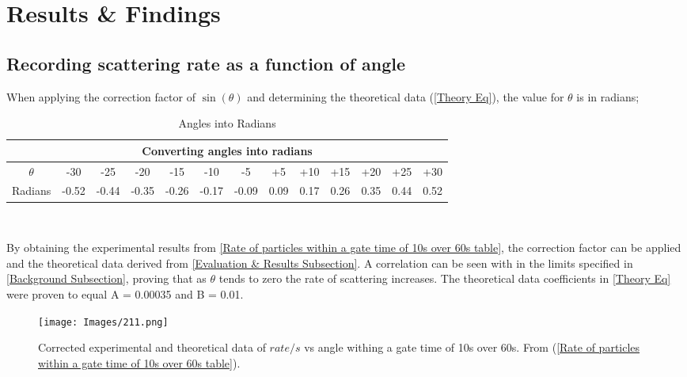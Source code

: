 \documentclass[12pt]{article}
\begin{document}
\section{Results \& Findings}
\label{Results & Findings Section}
\subsection{Recording scattering rate as a function of angle}
\label{Recording scattering rate as a function of angle Findings}

When applying the correction factor of $\sin(\theta)$ and determining the theoretical data (\cref{Theory Eq}), the value for $\theta$ is in radians;

\begin{table}[H]
\begin{center}
 \footnotesize
 \begin{tabular}{|c||c|c|c|c|c|c||c|c|c|c|c|c|}
 \hline
 \multicolumn{13}{|c|}{Converting angles into radians} \\
 \hline \hline
 $\theta$ & -30 & -25 & -20 & -15 & -10 & -5 & +5 & +10 & +15 & +20 & +25 & +30 \\
 \hline
 Radians & -0.52 & -0.44 & -0.35 & -0.26 & -0.17 & -0.09 & 0.09 & 0.17 & 0.26 & 0.35 & 0.44 & 0.52 \\
 \hline
 \end{tabular} \\ 
 \caption{Angles into Radians}
 \label{Angles into Radians}
\end{center}
\end{table}

By obtaining the experimental results from \cref{Rate of particles within a gate time of 10s over 60s table}, the correction factor can be applied and the theoretical data derived from \cref{Evaluation & Results Subsection}. A correlation can be seen with in the limits specified in \cref{Background Subsection}, proving that as $\theta$ tends to zero the rate of scattering increases. The theoretical data coefficients in \cref{Theory Eq} were proven to equal A = 0.00035 and B = 0.01. \\

\begin{figure}[H]
\centering
\texttt{[image: Images/211.png]}
\caption{Corrected experimental and theoretical data of $rate/s$ vs angle withing a gate time of 10s over 60s. From (\cref{Rate of particles within a gate time of 10s over 60s table}).}
\label{2.1.1 Graph}
\end{figure}
\end{document}
